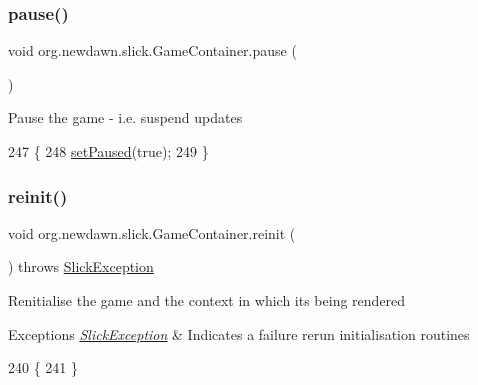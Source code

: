 \subsubsection{\texorpdfstring{pause()}{pause()}}
{\footnotesize\ttfamily void org.\+newdawn.\+slick.\+Game\+Container.\+pause (\begin{DoxyParamCaption}{ }\end{DoxyParamCaption})\hspace{0.3cm}{\ttfamily [inline]}}

Pause the game -\/ i.\+e. suspend updates 
\begin{DoxyCode}
247     \{
248         \mbox{\hyperlink{classorg_1_1newdawn_1_1slick_1_1_game_container_a8f4bc4fa90e71731f9ae4a97bba85c69}{setPaused}}(\textcolor{keyword}{true});
249     \}
\end{DoxyCode}
\mbox{\label{classorg_1_1newdawn_1_1slick_1_1_game_container_ac7f96cd2a8598d125a7ba4ce6c1e2b6a}} 
\subsubsection{\texorpdfstring{reinit()}{reinit()}}
{\footnotesize\ttfamily void org.\+newdawn.\+slick.\+Game\+Container.\+reinit (\begin{DoxyParamCaption}{ }\end{DoxyParamCaption}) throws \mbox{\hyperlink{classorg_1_1newdawn_1_1slick_1_1_slick_exception}{Slick\+Exception}}\hspace{0.3cm}{\ttfamily [inline]}}

Renitialise the game and the context in which it\textquotesingle{}s being rendered


\begin{DoxyExceptions}{Exceptions}
{\em \mbox{\hyperlink{classorg_1_1newdawn_1_1slick_1_1_slick_exception}{Slick\+Exception}}} & Indicates a failure rerun initialisation routines \\
\hline
\end{DoxyExceptions}

\begin{DoxyCode}
240                                                \{
241     \}
\end{DoxyCode}
\mbox{\label{classorg_1_1newdawn_1_1slick_1_1_game_container_ac0ac20b8d72db2ce4b28e2cf31a5c4c0}} 
